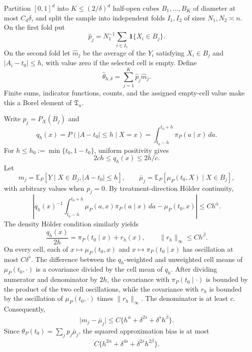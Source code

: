 Partition \([0,1]^d\) into \(K\le(2/\delta)^d\) half-open cubes \(B_1,\ldots,B_K\) of diameter at most \(C_d\delta\), and split the sample into independent folds \(I_1,I_2\) of sizes \(N_1,N_2\asymp n\). On the first fold put
\[
\widehat p_j=N_1^{-1}\sum_{i\in I_1}\mathbf 1\{X_i\in B_j\}.
\]
On the second fold let \(\widehat m_j\) be the average of the \(Y_i\) satisfying \(X_i\in B_j\) and \(\lvert A_i-t_0\rvert\le h\), with value zero if the selected cell is empty. Define
\[
\widehat\theta_{h,\delta}=\sum_{j=1}^K\widehat p_j\widehat m_j.
\]
Finite sums, indicator functions, counts, and the assigned empty-cell value make this a Borel element of \(\mathfrak T_n\).

Write \(p_j=P_X(B_j)\) and
\[
q_h(x)=P(\lvert A-t_0\rvert\le h\mid X=x)
=\int_{t_0-h}^{t_0+h}\pi_P(a\mid x)\,da.
\]
For \(h\le h_0:=\min\{t_0,1-t_0\}\), uniform positivity gives
\[
2ch\le q_h(x)\le 2h/c.
\]
Let
\[
m_j=\mathbb E_P[Y\mid X\in B_j,\lvert A-t_0\rvert\le h],
\qquad
\bar\mu_j=\mathbb E_P[\mu_P(t_0,X)\mid X\in B_j],
\]
with arbitrary values when \(p_j=0\). By treatment-direction H\"older continuity,
\[
\left|q_h(x)^{-1}\int_{t_0-h}^{t_0+h}
\mu_P(a,x)\pi_P(a\mid x)\,da-\mu_P(t_0,x)
\right|
\le C h^{\bar\alpha}.
\]
The density H\"older condition similarly yields
\[
\frac{q_h(x)}{2h}=\pi_P(t_0\mid x)+r_h(x),
\qquad \lVert r_h\rVert_\infty\le C h^{\bar\beta}.
\]
On every cell, each of \(x\mapsto\mu_P(t_0,x)\) and \(x\mapsto\pi_P(t_0\mid x)\) has oscillation at most \(C\delta^{\bar s}\). The difference between the \(q_h\)-weighted and unweighted cell means of \(\mu_P(t_0,\cdot)\) is a covariance divided by the cell mean of \(q_h\). After dividing numerator and denominator by \(2h\), the covariance with \(\pi_P(t_0\mid\cdot)\) is bounded by the product of the two cell oscillations, while the covariance with \(r_h\) is bounded by the oscillation of \(\mu_P(t_0,\cdot)\) times \(\lVert r_h\rVert_\infty\). The denominator is at least \(c\). Consequently,
\[
\lvert m_j-\bar\mu_j\rvert
\le C\{h^{\bar\alpha}+\delta^{2\bar s}+\delta^{\bar s}h^{\bar\beta}\}.
\]
Since \(\theta_P(t_0)=\sum_jp_j\bar\mu_j\), the squared approximation bias is at most
\[
C\{h^{2\bar\alpha}+\delta^{4\bar s}+\delta^{2\bar s}h^{2\bar\beta}\}.
\]

